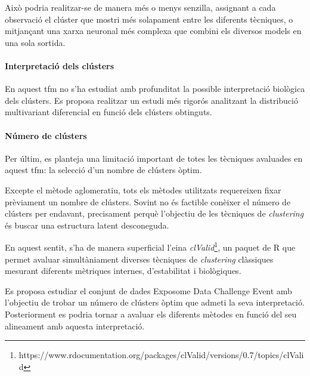\documentclass[CAT,BIB]{TFUOC}%
\begin{document}
            Això podria realitzar-se de manera més o menys senzilla,
            assignant a cada observació el clúster que mostri més solapament
            entre les diferents tècniques,
            o mitjançant una xarxa neuronal més complexa
            que combini els diversos models en una sola sortida.

        \paragraph{Interpretació dels clústers}
            En aquest \gls{tfm} no s'ha estudiat amb profunditat
            la possible interpretació biològica dels clústers.
            Es proposa realitzar un estudi més rigorós
            analitzant la distribució multivariant diferencial en funció dels clústers obtinguts.

        \paragraph{Número de clústers}
            Per últim,
            es planteja una limitació important de totes les tècniques avaluades
            en aquest \gls{tfm}:
            la selecció d'un nombre de clústers òptim.

            Excepte el mètode aglomeratiu,
            tots els mètodes utilitzats requereixen fixar prèviament un nombre de clústers.
            Sovint no és factible conèixer el número de clústers per endavant,
            precisament perquè l'objectiu de les tècniques de \textit{clustering}
            és buscar una estructura latent desconeguda.

            En aquest sentit, s'ha de manera superficial l'eina \textit{clValid}\footnote{https://www.rdocumentation.org/packages/clValid/versions/0.7/topics/clValid},
            un paquet de R que permet avaluar simultàniament
            diverses tècniques de \textit{clustering} clàssiques
            mesurant diferents mètriques internes, d'estabilitat i biològiques.

            Es proposa estudiar el conjunt de dades Exposome Data Challenge Event
            amb l'objectiu de trobar un número de clústers òptim
            que admeti la seva interpretació.
            Posteriorment es podria tornar a avaluar els diferents mètodes
            en funció del seu alineament amb aquesta interpretació.
\end{document}

